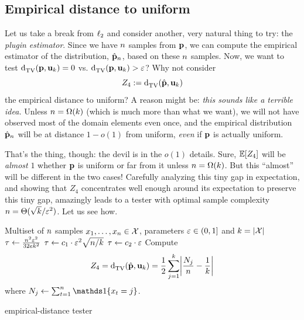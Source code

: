 
\subsection{Empirical distance to uniform}
  \label{sec:uniformity:empirical}
 Let us take a break from $\lp[2]$ and consider another, very natural thing to try: the \emph{plugin estimator}. Since we have $\ns$ samples from $\p$, we can compute the empirical estimator of the distribution, $\hat{\p}_\ns$, based on these $\ns$ samples. Now, we want to test $\totalvardist{\p}{\uniform_\ab}=0$ vs. $\totalvardist{\p}{\uniform_\ab}>\dst$? Why not consider 
\begin{equation}
    Z_4 \eqdef \totalvardist{\hat{\p}}{\uniform_\ab}
\end{equation}
the empirical distance to uniform? A reason might be: \emph{this sounds like a terrible idea.} Unless $\ns = \Omega(\ab)$ (which is much more than what we want), we will not have observed most of the domain elements even once, and the empirical distribution $\hat{\p}_\ns$ will be at distance $1-o(1)$ from uniform, \emph{even} if $\p$ is actually uniform. 

That's the thing, though: the devil is in the $o(1)$ details. Sure, $\expect{Z_4}$ will be \emph{almost} $1$ whether $\p$ is uniform or far from it unless $\ns = \Omega(\ab)$. But this ``almost'' will be different in the two cases! Carefully analyzing this tiny gap in expectation, and showing that $Z_4$ concentrates well enough around its expectation to preserve this tiny gap, amazingly leads to a tester with optimal sample complexity $\ns = \Theta(\sqrt{\ab}/\dst^2)$. Let us see how.

\begin{algorithm}[ht!]
  \begin{algorithmic}[1]
    \Require Multiset of $\ns$ samples $x_1,\dots,x_\ns \in \domain$, parameters $\dst\in(0,1]$ and $\ab = \abs{\domain}$
    \If{ $\ns \leq \ab$ }
        \State $\tau \gets \frac{\ns^2\dst^2}{32e\ab^2}$
        \State $\tau \gets c_1\cdot \dst^2\sqrt{\ns/\ab}$ 
    \Else
        \State $\tau \gets c_2\cdot\dst$ 
    \EndIf
    \State Compute 
    \[
        Z_4 = \totalvardist{\hat{\p}}{\uniform_\ab} = \frac{1}{2} \sum_{j=1}^\ab \abs{\frac{\occur_j}{\ns} - \frac{1}{\ab} }
    \] where $\occur_j \gets \sum_{t=1}^\ns\indic{x_t=j}$.
     \Return \reject {}
    \Else\ 
      \Return \accept {}
    \EndIf
  \end{algorithmic}
  \caption{\label{algo:empirical:plugin}\sc empirical-distance tester}
\end{algorithm}

